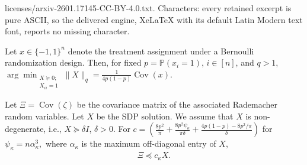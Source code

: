 \documentclass[10pt,a4paper]{amsart}
\begin{document}
licenses/arxiv-2601.17145-CC-BY-4.0.txt. Characters: every retained excerpt is pure ASCII, so the delivered engine, XeLaTeX with its default Latin Modern text font, reports no missing character.
\begin{proposition}\label{prop:X_norm_covariance_min}
Let $x \in \{-1,1\}^n$ denote the treatment assignment under a Bernoulli randomization design. Then, for fixed $p= \mathbb{P}(x_i = 1)$, $i \in [n]$, and $q>1$, $\arg \min_{\substack{X \succeq 0; \\ X_{ii}=1}} \|X\|_{q} = \frac{1}{4p(1-p)}\operatorname{Cov}(x)$.
\end{proposition}

\begin{theorem} \label{thm:approximation_error}
Let $\Xi = \operatorname{Cov}(\zeta)$ be the covariance matrix of the associated Rademacher random variables. Let $X$ be the SDP solution. We assume that $X$ is non-degenerate, i.e., $X \succeq \delta I$, $\delta > 0$. For $c = \left( \frac{8p^2}{\pi}  + \frac{8p^2 \psi_\kappa}{\pi \delta} + \frac{4p(1-p) - 8p^2/\pi}{\delta}  \right)$ for $\psi_\kappa= n \alpha_\kappa^{3},$ where $\alpha_\kappa$ is the maximum off-diagonal entry of $X$,
\begin{align*}
    \Xi \preceq c_\kappa X.
\end{align*}
\end{theorem}
\end{document}
